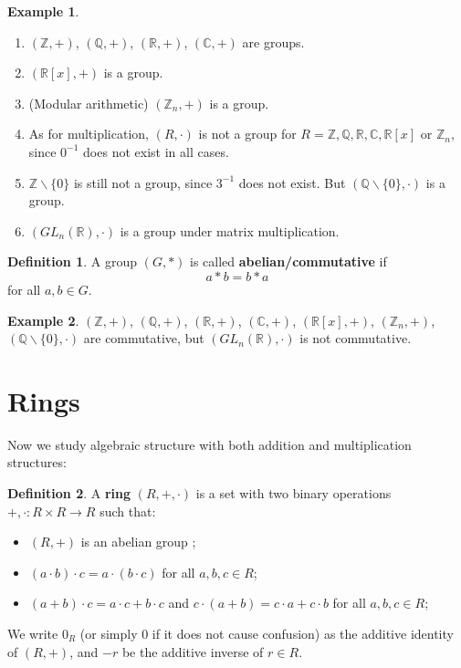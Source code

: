 \documentclass[11pt,openany]{book}
\theoremstyle{plain}
\theoremstyle{definition}
\newtheorem{definition}[definition]{Definition}
\newtheorem{example}[example]{Example}
\theoremstyle{remark}
\begin{document}
\begin{example}
    \begin{enumerate}
        \item $(\mathbb{Z},+)$, $(\mathbb{Q},+)$, $(\mathbb{R},+)$, $(\mathbb{C},+)$ are groups.
        \item $(\mathbb{R}[x],+)$ is a group.
        \item (Modular arithmetic) $(\mathbb{Z}_n,+)$ is a group.
        \item As for multiplication, $(R,\cdot)$ is not a group for $R = \mathbb{Z}, \mathbb{Q}, \mathbb{R}, \mathbb{C}, \mathbb{R}[x]$ or $\mathbb{Z}_n$, since $0^{-1}$ does not exist in all cases.
        \item $\mathbb{Z} \backslash \{0\}$ is still not a group, since $3^{-1}$ does not exist. But $(\mathbb{Q}\backslash \{0\}, \cdot)$ is a group.
        \item $(GL_n(\mathbb{R}), \cdot)$ is a group under matrix multiplication.
    \end{enumerate}
\end{example}    

\begin{definition}
    A group $(G, \ast)$ is called {\bf abelian/commutative} if
    $$a \ast b = b \ast a$$
    for all $a, b \in G$.
\end{definition}

\begin{example}
$(\mathbb{Z},+)$, $(\mathbb{Q},+)$, $(\mathbb{R},+)$, $(\mathbb{C},+)$, $(\mathbb{R}[x],+)$, $(\mathbb{Z}_n,+)$, $(\mathbb{Q}\backslash \{0\}, \cdot)$ are commutative, but $(GL_n(\mathbb{R}), \cdot)$ is not commutative.
\end{example}    

\section{Rings}
Now we study algebraic structure with both addition and multiplication structures:
\begin{definition}
    A {\bf ring} $(R,+,\cdot)$ is a set with two binary operations $+, \cdot: R \times R \to R$ such that:
    \begin{itemize}
        \item $(R,+)$ is an abelian group ;
        \item $(a\cdot b) \cdot c = a \cdot (b \cdot c)$ for all $a, b, c \in R$;
        \item $(a+b)\cdot c = a\cdot c + b \cdot c$ and $c \cdot (a+b) = c\cdot a + c\cdot b$ for all $a, b, c \in R$;
    \end{itemize}
We write $0_R$ (or simply $0$ if it does not cause confusion) as the additive identity of $(R,+)$, and $-r$ be the additive inverse of $r \in R$.
\end{definition}
\end{document}

